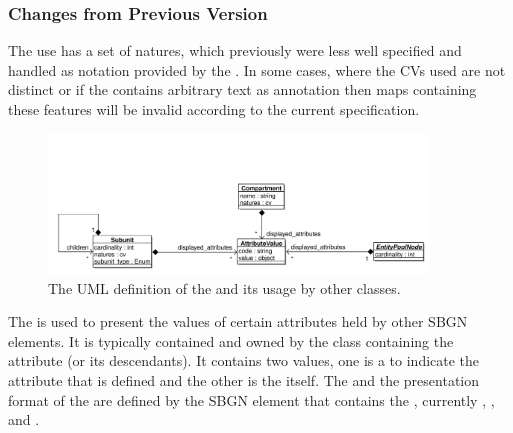 

\subsubsection{Changes from Previous Version}

The use  has a set of natures, which previously
were less well specified and handled as notation provided by the
.  In some cases, where the CVs used are
not distinct or if the  contains arbitrary
text as annotation then maps containing these features will be invalid
according to the current specification.

\label{defn:AttributeValue}

\begin{figure}[htb]
  \centering
  \includegraphics[width = 0.9\textwidth]{images/attributevalueuml}
  \caption{The UML definition of the  and
    its usage by other classes.}
  \label{fig:techref:attributevalueuml}
\end{figure}

The  is used to present the values of certain
attributes held by other SBGN elements. It is typically contained and
owned by the class containing the attribute (or its descendants). It
contains two values, one is a  to indicate the attribute
that is defined and the other is the itself. The
 and the presentation format of the  are
defined by the SBGN element that contains the
, currently ,
, and .



